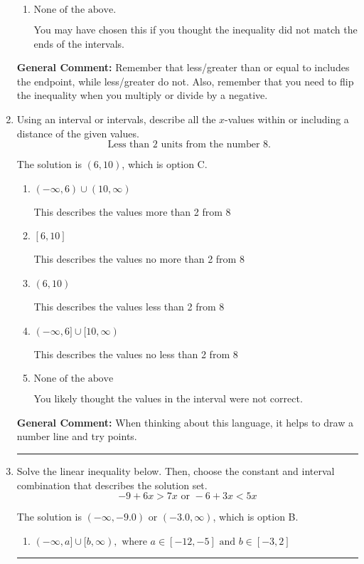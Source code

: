 \documentclass{extbook}[14pt]
\newcommand{\litem}[1]{\item #1

\rule{\textwidth}{0.4pt}}
\begin{document}
\begin{enumerate}
{\begin{enumerate}[label=\Alph*.]
 $[-2.722, \infty)$, which corresponds to switching the direction of the interval. You likely did this if you did not flip the inequality when dividing by a negative!
\item \( \text{None of the above}. \)

You may have chosen this if you thought the inequality did not match the ends of the intervals.
\end{enumerate}

\textbf{General Comment:} Remember that less/greater than or equal to includes the endpoint, while less/greater do not. Also, remember that you need to flip the inequality when you multiply or divide by a negative.
}
\litem{
Using an interval or intervals, describe all the $x$-values within or including a distance of the given values.
\[ \text{ Less than } 2 \text{ units from the number } 8. \]

The solution is \( (6, 10) \), which is option C.\begin{enumerate}[label=\Alph*.]
\item \( (-\infty, 6) \cup (10, \infty) \)

This describes the values more than 2 from 8
\item \( [6, 10] \)

This describes the values no more than 2 from 8
\item \( (6, 10) \)

This describes the values less than 2 from 8
\item \( (-\infty, 6] \cup [10, \infty) \)

This describes the values no less than 2 from 8
\item \( \text{None of the above} \)

You likely thought the values in the interval were not correct.
\end{enumerate}

\textbf{General Comment:} When thinking about this language, it helps to draw a number line and try points.
}
\litem{
Solve the linear inequality below. Then, choose the constant and interval combination that describes the solution set.
\[ -9 + 6 x > 7 x \text{ or } -6 + 3 x < 5 x \]

The solution is \( (-\infty, -9.0) \text{ or } (-3.0, \infty) \), which is option B.\begin{enumerate}[label=\Alph*.]
\item \( (-\infty, a] \cup [b, \infty), \text{ where } a \in [-12, -5] \text{ and } b \in [-3, 2] \)


\end{enumerate}}
\end{enumerate}
\end{document}
